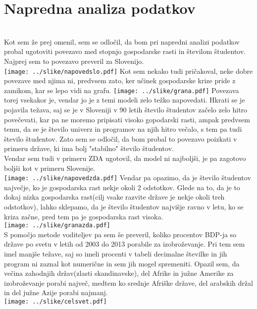 \documentclass[11pt,a4paper]{article}
\begin{document}
\section{Napredna analiza podatkov} \\
Kot sem že prej omenil, sem se odločil, da bom pri napredni analizi podatkov probal ugotoviti povezavo med stopnjo gospodarske rasti in številom študentov. \\
Najprej sem to povezavo preveril za Slovenijo. \\
\texttt{[image: ../slike/napovedslo.pdf]} 
Kot sem nekako tudi pričakoval, neke dobre povezave med njima ni, predvsem zato, ker učinek gospodarske krize pride z zamikom, kar se lepo vidi na grafu.
\texttt{[image: ../slike/grana.pdf]}
Povezava torej vsekakor je, vendar jo je z temi modeli zelo težko napovedati. Hkrati se je pojavila težava, saj se je v Sloveniji v 90 letih število študentov začelo zelo hitro povečevati, kar pa ne moremo pripisati visoko gopodarski rasti, ampak predvsem temu, da se je število univerz in programov na njih hitro večalo, s tem pa tudi število študentov. Zato sem se odločil, da bom probal to povezavo poizkati v primeru države, ki ima bolj "stabilno" število študentov. \\
Vendar sem tudi v primeru ZDA ugotovil, da model ni najboljši, je pa zagotovo boljši kot v primeru Slovenije. \\
\texttt{[image: ../slike/napovedzda.pdf]}
Vendar pa opazimo, da je število študentov največje, ko je gospodarska rast nekje okoli 2 odstotkov. Glede na to, da je to dokaj nizka gospodarska rast(cilj vsake razvite države je nekje okoli treh odstotkov), lahko sklepamo, da je število študentov najvišje ravno v letu, ko se kriza začne, pred tem pa je gospodarska rast visoka. \\
\texttt{[image: ../slike/granazda.pdf]}\\
S pomočjo metode voditeljev pa sem še preveril, koliko procentov BDP-ja so države po svetu v letih od 2003 do 2013 porabile za izobroževanje. Pri tem sem imel manjše težave, saj so imeli procenti v tabeli decimalne številke in jih program ni zaznal kot numerične in sem jih mogel spremeniti. Opazil sem, da večina zahodnjih držav(zlasti skandinavske), del Afrike in južne Amerike za izobroževanje porabi največ, medtem ko srednje Afriške države, del arabskih držal in del južne Azije porabi najmanj.\\
\texttt{[image: ../slike/celsvet.pdf]}
\end{document}
